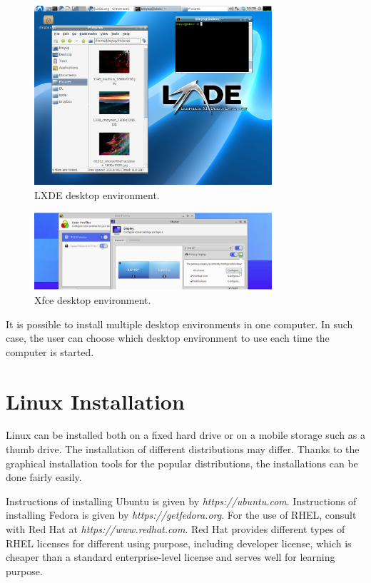 \begin{figure}
	\centering
	\includegraphics[width=250pt]{chapters/ch-brief-introduction-to-linux/figures/lxde_demo.png}
	\caption{LXDE desktop environment.} \label{ch:bitl:fig:lxdedemo}
\end{figure}

\begin{figure}
	\centering
	\includegraphics[width=250pt]{chapters/ch-brief-introduction-to-linux/figures/xfce_demo.png}
	\caption{Xfce desktop environment.} \label{ch:bitl:fig:xfcedemo}
\end{figure}

It is possible to install multiple desktop environments in one computer. In such case, the user can choose which desktop environment to use each time the computer is started.

\section{Linux Installation}

Linux can be installed both on a fixed hard drive or on a mobile storage such as a thumb drive. The installation of different distributions may differ. Thanks to the graphical installation tools for the popular distributions, the installations can be done fairly easily.

Instructions of installing Ubuntu is given by \textit{https://ubuntu.com}. Instructions of installing Fedora is given by \textit{https://getfedora.org}. For the use of RHEL, consult with Red Hat at \textit{https://www.redhat.com}. Red Hat provides different types of RHEL licenses for different using purpose, including developer license, which is cheaper than a standard enterprise-level license and serves well for learning purpose.
